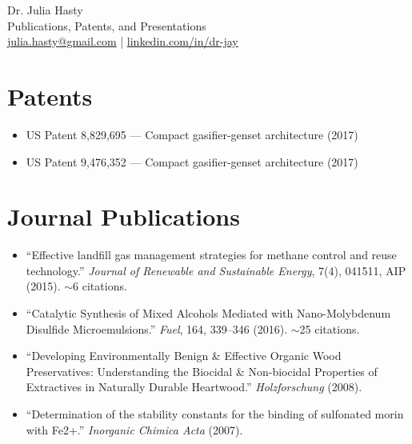 \documentclass[11pt]{article}
\begin{document}
\begin{center}
{\LARGE Dr. Julia Hasty}\\[4pt]
{\large Publications, Patents, and Presentations}\\[4pt]
\href{mailto:julia.hasty@gmail.com}{julia.hasty@gmail.com} |
\href{https://www.linkedin.com/in/dr-jay/}{linkedin.com/in/dr-jay}
\end{center}

\section*{Patents}
\begin{itemize}
\item US Patent 8,829,695 --- Compact gasifier-genset architecture (2017)
\item US Patent 9,476,352 --- Compact gasifier-genset architecture (2017)
\end{itemize}

\section*{Journal Publications}
\begin{itemize}
\item ``Effective landfill gas management strategies for methane control and reuse technology.'' \textit{Journal of Renewable and Sustainable Energy}, 7(4), 041511, AIP (2015). $\sim$6 citations.
\item ``Catalytic Synthesis of Mixed Alcohols Mediated with Nano-Molybdenum Disulfide Microemulsions.'' \textit{Fuel}, 164, 339--346 (2016). $\sim$25 citations.
\item ``Developing Environmentally Benign \& Effective Organic Wood Preservatives: Understanding the Biocidal \& Non-biocidal Properties of Extractives in Naturally Durable Heartwood.'' \textit{Holzforschung} (2008).
\item ``Determination of the stability constants for the binding of sulfonated morin with Fe2+.'' \textit{Inorganic Chimica Acta} (2007).
\end{itemize}
\end{document}
